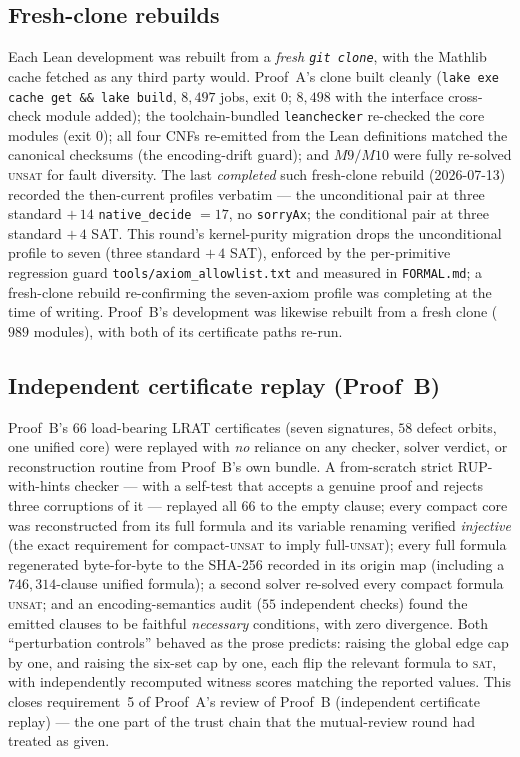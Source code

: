 \documentclass[11pt,reqno]{amsart}
\theoremstyle{definition}
\theoremstyle{remark}
\begin{document}
\subsection{Fresh-clone rebuilds}
Each Lean development was rebuilt from a \emph{fresh \texttt{git clone}}, with the Mathlib
cache fetched as any third party would. Proof~A's clone built cleanly (\texttt{lake exe
cache get \&\& lake build}, $8{,}497$ jobs, exit $0$; $8{,}498$ with the interface
cross-check module added); the toolchain-bundled \texttt{leanchecker} re-checked the core
modules (exit $0$); all four CNFs re-emitted from the Lean definitions matched the
canonical checksums (the encoding-drift guard); and $M9/M10$ were fully re-solved
\textsc{unsat} for fault diversity. The last \emph{completed} such fresh-clone rebuild
(2026-07-13) recorded the then-current profiles verbatim --- the unconditional pair at
three standard $+\,14$ \texttt{native\_decide} $=17$, no \texttt{sorryAx}; the conditional
pair at three standard $+\,4$ SAT. This round's kernel-purity migration drops the
unconditional profile to seven (three standard $+\,4$ SAT), enforced by the per-primitive
regression guard \texttt{tools/axiom\_allowlist.txt} and measured in \texttt{FORMAL.md}; a
fresh-clone rebuild re-confirming the seven-axiom profile was completing at the time of
writing. Proof~B's development was likewise rebuilt from a fresh clone ($989$ modules),
with both of its certificate paths re-run.

\subsection{Independent certificate replay (Proof~B)}
Proof~B's $66$ load-bearing LRAT certificates (seven signatures, $58$ defect orbits, one
unified core) were replayed with \emph{no} reliance on any checker, solver verdict, or
reconstruction routine from Proof~B's own bundle. A from-scratch strict RUP-with-hints
checker --- with a self-test that accepts a genuine proof and rejects three corruptions of
it --- replayed all $66$ to the empty clause; every compact core was reconstructed from its
full formula and its variable renaming verified \emph{injective} (the exact requirement for
compact-\textsc{unsat} to imply full-\textsc{unsat}); every full formula regenerated
byte-for-byte to the SHA-256 recorded in its origin map (including a $746{,}314$-clause
unified formula); a second solver re-solved every compact formula \textsc{unsat}; and an
encoding-semantics audit ($55$ independent checks) found the emitted clauses to be faithful
\emph{necessary} conditions, with zero divergence. Both ``perturbation controls'' behaved
as the prose predicts: raising the global edge cap by one, and raising the six-set cap by
one, each flip the relevant formula to \textsc{sat}, with independently recomputed witness
scores matching the reported values. This closes requirement~5 of Proof~A's review of
Proof~B (independent certificate replay) --- the one part of the trust chain that the
mutual-review round had treated as given.
\end{document}
